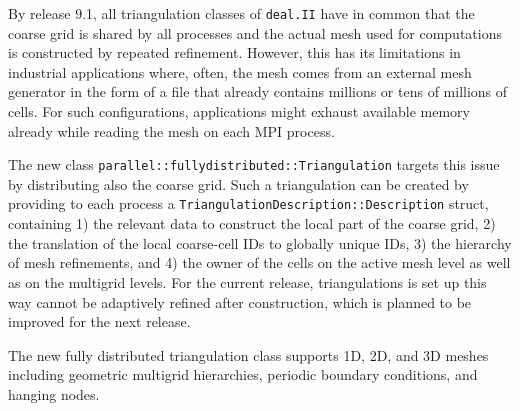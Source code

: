 \documentclass{ansarticle-preprint}
\begin{document}
By release 9.1, all triangulation classes of \texttt{deal.II} have in common that the coarse grid is shared by
all processes and the actual mesh used for computations is constructed by repeated
refinement. However, this has its limitations in industrial applications where, often, the mesh comes
from an external mesh generator in the form of a file that already contains millions
or tens of millions of cells. For such configurations, applications might exhaust
available memory already while reading the mesh on each MPI process.

The new class \texttt{parallel::fullydistributed::Triangulation} targets this issue
by distributing also the coarse grid. Such
a triangulation can be created by providing to each process a \texttt{Triangulation\-De\-scrip\-tion::Description} struct, containing
1) the relevant data to construct the local part of the coarse grid, 2) the
translation of the local coarse-cell IDs to globally unique IDs, 3) the hierarchy
of mesh refinements, and 4) the owner of the cells on the active mesh level as well
as on the multigrid levels. For the current release, triangulations is set up
this way cannot be adaptively refined after construction, which is planned to be
improved for the next release.



The new fully distributed triangulation class supports 1D, 2D, and 3D meshes
including geometric multigrid hierarchies, periodic boundary conditions, and
hanging nodes.
\end{document}
